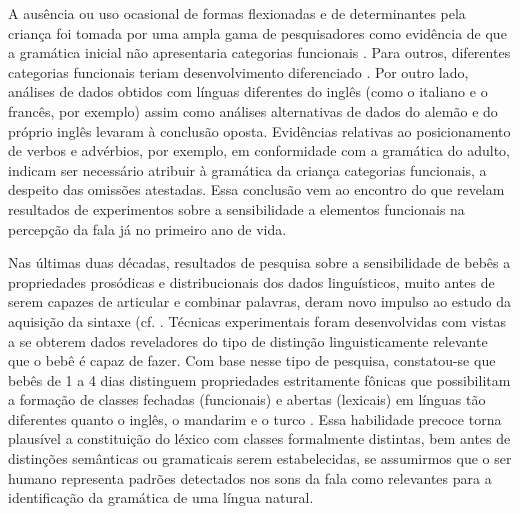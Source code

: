 \documentclass[output=paper]{LSP/langsci}
\begin{document}
A ausência ou uso ocasional de formas flexionadas e de determinantes pela criança foi tomada por uma ampla gama de pesquisadores como evidência de que a gramática inicial não apresentaria categorias funcionais \citep{guilfoylenoonan1988,labeaux1988,platzack1990,radford1990}. Para outros, diferentes categorias funcionais teriam desenvolvimento diferenciado \citep{clahsen1990,meiselmuller1992}. Por outro lado, análises de dados obtidos com línguas diferentes do inglês (como o italiano e o francês, por exemplo) \citep{hyams1992} assim como análises alternativas de dados do alemão \citep{poeppelwexler1993} e do próprio inglês \citep{hyams1992,hyams2001} levaram à conclusão oposta. Evidências relativas ao posicionamento de verbos e advérbios, por exemplo, em conformidade com a gramática do adulto, indicam ser necessário atribuir à gramática da criança categorias funcionais, a despeito das omissões atestadas. Essa conclusão vem ao encontro do que revelam resultados de experimentos sobre a sensibilidade a elementos funcionais na percepção da fala já no primeiro ano de vida. 

Nas últimas duas décadas, resultados de pesquisa sobre a sensibilidade de bebês a propriedades prosódicas e distribucionais dos dados linguísticos, muito antes de serem capazes de articular e combinar palavras, deram novo impulso ao estudo da aquisição da sintaxe (cf. \citealt{morgandemuth1996,weissenbornhohle2001}. Técnicas experimentais foram desenvolvidas com vistas a se obterem dados reveladores do tipo de distinção linguisticamente relevante que o bebê é capaz de fazer. Com base nesse tipo de pesquisa, constatou-se que bebês de 1 a 4 dias distinguem propriedades estritamente fônicas que possibilitam a formação de classes fechadas (funcionais) e abertas (lexicais) em línguas tão diferentes quanto o inglês, o mandarim e o turco \citep{morgan_etal1996}. Essa habilidade precoce torna plausível a constituição do léxico com classes formalmente distintas, bem antes de distinções semânticas ou gramaticais serem estabelecidas, se assumirmos que o ser humano representa padrões detectados nos sons da fala como relevantes para a identificação da gramática de uma língua natural. 
\end{document}
